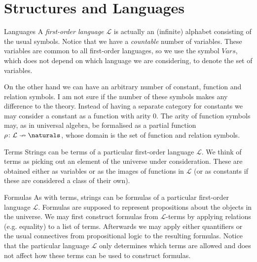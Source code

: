 \documentclass[article, a4paper, 11pt, oneside]{memoir}
\title{\doctitle}
\author{\docauthor}
\numberwithin{equation}{chapter}
\newcommand{\calL}{\mathcal{L}}
\theoremstyle{nonumberplain}
\begin{document}
\maketitle

\chapter{Structures and Languages}

\newcommand{\limplies}{\vDash}
\newcommand{\valid}{\vDash}
\newcommand{\lcond}{\rightarrow}
\let\oldmodels\models
\renewcommand{\models}{\vDash}
\newcommand{\sats}[1]{\vDash_{#1}}
\newcommand{\notsats}[1]{\not\vDash_{#1}}
\newcommand{\vars}{\mathit{Vars}}

\begin{notelist}
    \item[Languages]
    A \emph{first-order language} $\calL$ is actually an (infinite) alphabet consisting of the usual symbols. Notice that we have a \emph{countable} number of variables. These variables are common to all first-order languages, so we use the symbol $\vars$, which does not depend on which language we are considering, to denote the set of variables.
    
    On the other hand we can have an arbitrary number of constant, function and relation symbols. I am not sure if the number of these symbols makes any difference to the theory. Instead of having a separate category for constants we may consider a constant as a function with arity $0$. The arity of function symbols may, as in universal algebra, be formalised as a partial function $\rho \colon \calL \nrightarrow \naturals$, whose domain is the set of function and relation symbols.

    \item[Terms]
    Strings can be terms of a particular first-order language $\calL$. We think of terms as picking out an element of the universe under consideration. These are obtained either as variables or as the images of functions in $\calL$ (or as constants if these are considered a class of their own).
    
    \item[Formulas]
    As with terms, strings can be formulas of a particular first-order language $\calL$. Formulas are supposed to represent propositions about the objects in the universe. We may first construct formulas from $\calL$-terms by applying relations (e.g. equality) to a list of terms. Afterwards we may apply either quantifiers or the usual connectives from propositional logic to the resulting formulas. Notice that the particular language $\calL$ only determines which terms are allowed and does not affect how these terms can be used to construct formulas.
    

\end{notelist}
\end{document}

